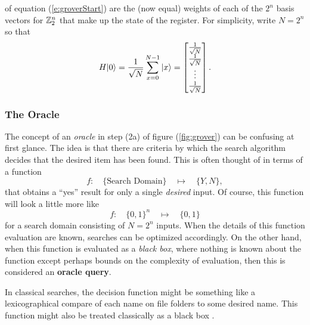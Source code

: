 of equation (\ref{e:groverStart}) are the (now equal) weights of each 
of the $2^n$ basis vectors for ${\mathbb{Z}}_2^n$ that make up the state of the
register.
For simplicity, write $N=2^n$ so that
\begin{equation}
H{|{0}\rangle} = \frac{1}{\sqrt{N}}\sum_{x=0}^{N-1}{|{x}\rangle} 
= \left[ \begin{matrix}
            \frac{1}{\sqrt{N}}\\
            \frac{1}{\sqrt{N}}\\
            \vdots\\
            \frac{1}{\sqrt{N}}
         \end{matrix} 
  \right].
\end{equation}

\subsubsection{The Oracle}

The concept of an \emph{oracle} in step (2a) of figure (\ref{fig:grover}) 
can be confusing at first glance.  The idea is that there are criteria
by which the search algorithm decides that the desired item has been found.
This is often thought of in terms of a function
\begin{equation}
f\colon\quad\lbrace\mbox{Search Domain}\rbrace\quad\mapsto\quad\lbrace Y,N\rbrace,
\end{equation}
that obtains a ``yes'' result for only a single {\sl desired} input.
Of course, this function will look a little more like 
\begin{equation}
f\colon\quad\lbrace 0,1\rbrace^n\quad\mapsto\quad\lbrace 0,1\rbrace
\end{equation}
for a search domain consisting of $N=2^n$ inputs.
When the details of this function evaluation are known, searches can
be optimized accordingly.  On the other hand, when this function is 
evaluated as a \emph{black box}, where nothing is known about the function 
except perhaps bounds on the complexity of evaluation, then this is 
considered an \textbf{oracle query}.

In classical searches, the decision function might be something like
a lexicographical 
compare of each name on file folders to some desired name.  
This function might also be treated classically as a black 
box .

